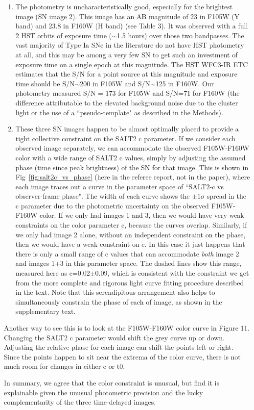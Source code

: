 \documentclass[11pt]{article}
\begin{document}
{\begin{enumerate}
\item{The photometry is uncharacteristically good, especially for the brightest image (SN image 2).  This image has an AB magnitude of 23 in F105W (Y band) and 23.8 in F160W (H band) (see Table 3).  It was observed with a full 2 HST orbits of exposure time ($\sim$1.5 hours) over those two bandpasses.  The vast majority of Type Ia SNe in the literature do not have HST photometry at all, and this may be among a very few SN to get such an investment of exposure time on a single epoch at this magnitude.    The HST WFC3-IR ETC estimates that the S/N for a point source at this magnitude and exposure time should be  S/N$\sim$200 in F105W and  S/N$\sim$125 in F160W.   Our photometry measured S/N = 173 for F105W and S/N=71 for F160W (the difference attributable to the elevated background noise due to the cluster light or the use of a ``pseudo-template" as described in the Methods).}
\item{These three SN images happen to be almost optimally placed to provide a tight collective constraint on the SALT2 c parameter.   If we consider each observed image separately, we can accommodate the observed F105W-F160W color with a wide range of SALT2 c values, simply by adjusting the assumed phase (time since peak brightness) of the SN for that image.   This is shown in Fig~\ref{fig:salt2c_vs_phase} (here in the referee report, not in the paper), where each image traces out a curve in the parameter space of ``SALT2-c vs observer-frame phase".   The width of each curve shows the $\pm1\sigma$ spread in the c parameter due to the photometric uncertainty on the observed F105W-F160W color.    If we only had images 1 and 3, then we would have very weak constraints on the color parameter c, because the curves overlap.  Similarly, if we only had image 2 alone, without an independent constraint on the phase, then we would have a weak constraint on c.   In this case it just happens that there is only a small range of c values that can accommodate \textit{both} image 2 and images 1+3 in this parameter space.  The dashed lines show this range, measured here as c=0.02$\pm$0.09, which is consistent with the constraint we get from the more complete and rigorous light curve fitting procedure described in the text.   Note that this serendipitous arrangement also helps to simultaneously constrain the phase of each of  image, as shown in the supplementary text.}
\end{enumerate}

Another way to see this is to look at the F105W-F160W color curve in Figure 11.  Changing the SALT2 c parameter would shift the grey curve up or down.  Adjusting the relative phase for each image can shift the points left or right.  Since the points happen to sit near the extrema of the color curve, there is not much room for changes in either c or t0.

In summary, we agree that the color constraint is unusual, but find it is explainable given the unusual photometric precision and the lucky complementarity of the three time-delayed images.
}
\end{document}
